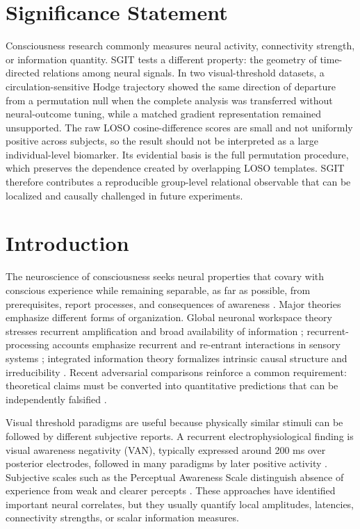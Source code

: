 \documentclass[12pt]{article}
\begin{document}
\section*{Significance Statement}
Consciousness research commonly measures neural activity, connectivity strength, or information quantity. SGIT tests a different property: the geometry of time-directed relations among neural signals. In two visual-threshold datasets, a circulation-sensitive Hodge trajectory showed the same direction of departure from a permutation null when the complete analysis was transferred without neural-outcome tuning, while a matched gradient representation remained unsupported. The raw LOSO cosine-difference scores are small and not uniformly positive across subjects, so the result should not be interpreted as a large individual-level biomarker. Its evidential basis is the full permutation procedure, which preserves the dependence created by overlapping LOSO templates. SGIT therefore contributes a reproducible group-level relational observable that can be localized and causally challenged in future experiments.

\section{Introduction}
The neuroscience of consciousness seeks neural properties that covary with conscious experience while remaining separable, as far as possible, from prerequisites, report processes, and consequences of awareness \citep{Aru2012,Koch2016,SethBayne2022}. Major theories emphasize different forms of organization. Global neuronal workspace theory stresses recurrent amplification and broad availability of information \citep{DehaeneChangeux2011}; recurrent-processing accounts emphasize recurrent and re-entrant interactions in sensory systems \citep{LammeRoelfsema2000,Lamme2006}; integrated information theory formalizes intrinsic causal structure and irreducibility \citep{Albantakis2023}. Recent adversarial comparisons reinforce a common requirement: theoretical claims must be converted into quantitative predictions that can be independently falsified \citep{Cogitate2025}.

Visual threshold paradigms are useful because physically similar stimuli can be followed by different subjective reports. A recurrent electrophysiological finding is visual awareness negativity (VAN), typically expressed around 200 ms over posterior electrodes, followed in many paradigms by later positive activity \citep{KoivistoRevonsuo2010,EklundWiens2018,Wiens2026}. Subjective scales such as the Perceptual Awareness Scale distinguish absence of experience from weak and clearer percepts \citep{RamsoyOvergaard2004,OvergaardSandberg2021}. These approaches have identified important neural correlates, but they usually quantify local amplitudes, latencies, connectivity strengths, or scalar information measures.
\end{document}
